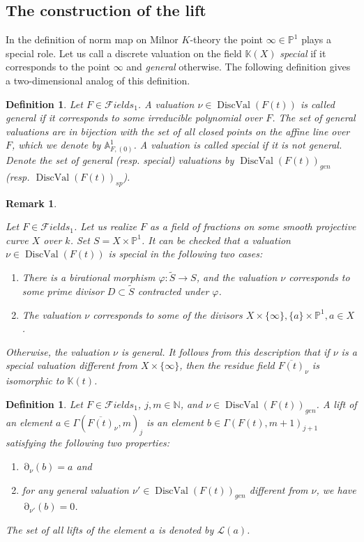 \documentclass[12pt]{extarticle}
\newtheorem{definition}[theorem]{Definition}
\newtheorem{remark}[theorem]{Remark}
\def\mb{\mathbb}
\def\mc{\mathcal}
\def\k{\mb K}
\def\t{\times}
\def\ol{\overline}
\def\wt{\widetilde}
\renewcommand{\P}{{\mb P}}
\def\F{{\mc Fields}}
\DeclareMathOperator{\ts}{\partial}
\DeclareMathOperator{\dval}{DiscVal}
\begin{document}
\subsection{The construction of the lift}
\label{sec:prel_results:lift}
In the definition of norm map on Milnor $K$-theory the point $\infty\in\P^1$ plays a special role. Let us call a discrete valuation on the field $\k(X)$ \emph{ special} if it corresponds to the point $\infty$ and \emph{general} otherwise. The following definition gives a two-dimensional analog of this definition.
\begin{definition}
\label{def:types_of_valuations}
Let $F\in \F_1$. A valuation $\nu\in \dval(F(t))$ is called \emph{general} if it corresponds to some irreducible polynomial over $F$. The set of general valuations are in bijection with  the set of all closed points on the affine line over $F$, which we denote by $\mb A_{F,(0)}^1$.  A valuation is called \emph{special} if it is not general. Denote the set of general (resp. special) valuations by $\dval(F(t))_{gen}$ (resp. $\dval(F(t))_{sp}$). 
\end{definition}

\begin{remark}
\label{rem:types_of_valuations}


Let $F\in\F_1$. Let us realize $F$ as a field of fractions on some smooth projective curve $X$ over $k$. Set $S=X\t \mathbb P^1$. It can be checked that a valuation $\nu\in \dval(F(t))$ is special in the following two cases:

\begin{enumerate}
    \item There is a birational morphism $\varphi\colon \wt S\to S$, and the valuation $\nu$ corresponds to some prime divisor $D\subset \wt S$ contracted under $\varphi$.
    \item The valuation $\nu$ corresponds to some of the divisors $X\t\{\infty\}, \{a\}\t\mathbb P^1, a\in X$.
\end{enumerate}

Otherwise, the valuation $\nu$ is general.
It follows from this description that if $\nu$ is a special valuation different from $X\times \{\infty\}$, then the residue field $\overline{F(t)}_\nu$ is isomorphic to $\k(t)$.
\end{remark}



\begin{definition}
\label{def:lift}
Let $F\in \F_1$, $j, m\in \mathbb N$, and $\nu\in \dval(F(t))_{gen}$. \emph{A lift} of an element $a\in \Gamma(\ol {F(t)}_\nu, m)_j$ is an element $b\in \Gamma(F(t), m+1)_{j+1}$ satisfying the following two properties:
\begin{enumerate}
    \item $\ts_\nu(b)=a$ and
    \item for any general valuation $\nu'\in\dval(F(t))_{gen}$ different from $\nu$, we have $\ts_{\nu'}(b)=0$.
\end{enumerate}

The set of all lifts of the element $a$ is denoted by $\mathcal L(a)$.
\end{definition}
\end{document}
